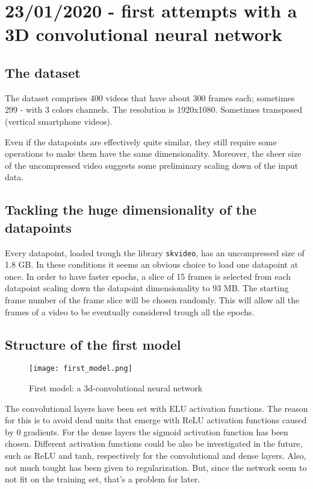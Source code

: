 
\section{23/01/2020 - first attempts with a 3D convolutional neural network}

\subsection{The dataset}
The dataset comprises 400 videos that have about 300 frames each; sometimes
299 - with 3 colors channels.
The resolution is 1920x1080. Sometimes transposed (vertical smartphone videos).

Even if the datapoints are effectively quite similar, they still require some operations
to make them have the same dimensionality. Moreover, the sheer size of the uncompressed
video suggests some preliminary scaling down of the input data.

\subsection{Tackling the huge dimensionality of the datapoints}

Every datapoint, loaded trough the library \texttt{skvideo}, has an uncompressed
size of 1.8 GB. In these conditions it seems an obvious choice to load one datapoint at once.
In order to have faster epochs, a slice of 15 frames is selected from each datapoint
scaling down the datapoint dimensionality to 93 MB.
The starting frame number of the frame slice will be chosen randomly. This will allow
all the frames of a video to be eventually considered trough all the epochs.

\subsection{Structure of the first model}

\begin{figure}[h]
\caption{First model: a 3d-convolutional neural network}
\centering
\texttt{[image: first\_model.png]}
\end{figure}

The convolutional layers have been set with ELU activation functions.
The reason for this is to avoid dead units that emerge with ReLU activation functions
caused by 0 gradients.
For the dense layers the sigmoid activation function has been chosen.
Different activation functions could be also be investigated in the future,
such as ReLU and tanh, respectively for the convolutional and dense layers.
Also, not much tought has been given to regularization. But, since the network
seem to not fit on the training set, that's a problem for later.

